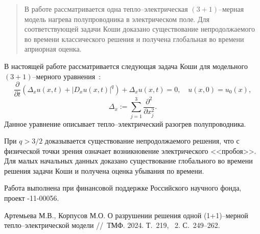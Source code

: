
\maketitle

\begin{abstract}
В работе рассматривается одна тепло–электрическая $(3+1)$--мерная модель нагрева полупроводника в электрическом поле. Для соответствующей задачи Коши  доказано  существование  непродолжаемого  во  времени  классического решения и получена глобальная во времени априорная оценка.

\end{abstract}

В настоящей работе рассматривается следующая задача Коши для модельного $(3+1)$--мерного уравнения~\cite{KorpAtrTMF}:
\begin{equation}\label{1.4-0-1}
	\dfrac{\partial}{\partial t}\left(\Delta_x u(x,t)+|D_x u(x,t)|^q\right)+\Delta_xu(x,t)=0,\quad u(x,0)=u_0(x),
\end{equation}
$$
\Delta_x:=\sum\limits_{j=1}^3\dfrac{\partial^2}{\partial x_j^2}.
$$
Данное уравнение описывает тепло--электрический разогрев полупроводника. 

При $q>3/2$ доказывается существование непродолжаемого решения, что с физической точки зрения означает возникновение электрического <<пробоя>>. Для малых начальных данных доказано существование глобального во времени решения задачи Коши и получена оценка убывания по времени.

Работа   выполнена   при   финансовой   поддержке   Российского   научного   фонда, проект   -11-00056.
%



\begin{thebibliography}{9} %
 Артемьева М.В., Корпусов М.О. О разрушении решения одной (1+1)--мерной тепло–электрической модели //~ТМФ. 2024. Т.~219, \textnumero~2. С.~249--262.


\end{thebibliography}





%

